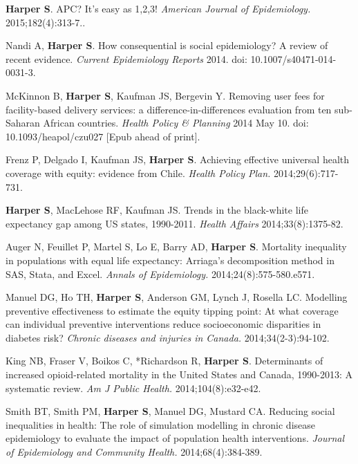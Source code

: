 \documentclass[
  letterpaper,
  DIV=11,
  numbers=noendperiod]{scrartcl}
\begin{document}
\begin{etaremune}
\item \textbf{Harper S}. APC? It's easy as 1,2,3! \emph{American Journal of Epidemiology.} 2015;182(4):313-7..
 
\item Nandi A, \textbf{Harper S}. How consequential is social epidemiology? A review of recent evidence. \emph{Current Epidemiology Reports} 2014. doi: 10.1007/s40471-014-0031-3.
 
\item *McKinnon B, \textbf{Harper S}, Kaufman JS, Bergevin Y. Removing user fees for facility-based delivery services: a difference-in-differences evaluation from ten sub-Saharan African countries. \emph{Health Policy \& Planning} 2014 May 10. doi: 10.1093/heapol/czu027 [Epub ahead of print].

\item Frenz P, Delgado I, Kaufman JS, \textbf{Harper S}. Achieving effective universal health coverage with equity: evidence from Chile. \emph{Health Policy Plan.} 2014;29(6):717-731.
 
\item \textbf{Harper S}, MacLehose RF, Kaufman JS. Trends in the black-white life expectancy gap among US states, 1990-2011. \emph{Health Affairs} 2014;33(8):1375-82.
 
\item Auger N, Feuillet P, Martel S, Lo E, Barry AD, \textbf{Harper S}. Mortality inequality in populations with equal life expectancy: Arriaga's decomposition method in SAS, Stata, and Excel. \emph{Annals of Epidemiology.} 2014;24(8):575-580.e571.
 
\item Manuel DG, Ho TH, \textbf{Harper S}, Anderson GM, Lynch J, Rosella LC. Modelling preventive effectiveness to estimate the equity tipping point: At what coverage can individual preventive interventions reduce socioeconomic disparities in diabetes risk? \emph{Chronic diseases and injuries in Canada.} 2014;34(2-3):94-102.
 
\item King NB, Fraser V, Boikos C, *Richardson R, \textbf{Harper S}. Determinants of increased opioid-related mortality in the United States and Canada, 1990-2013: A systematic review. \emph{Am J Public Health.} 2014;104(8):e32-e42.
 
\item Smith BT, Smith PM, \textbf{Harper S}, Manuel DG, Mustard CA. Reducing social inequalities in health: The role of simulation modelling in chronic disease epidemiology to evaluate the impact of population health interventions. \emph{Journal of Epidemiology and Community Health.} 2014;68(4):384-389.
 

\end{etaremune}
\end{document}
